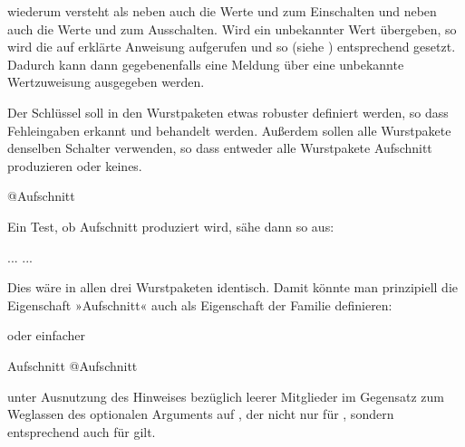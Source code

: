  wiederum versteht als  neben 
auch die Werte  und  zum Einschalten und neben
 auch die Werte  und  zum
Ausschalten. Wird ein unbekannter Wert übergeben, so wird die auf
 erklärte Anweisung
 aufgerufen und so
 (siehe
) entsprechend gesetzt. Dadurch
kann dann gegebenenfalls eine Meldung über eine unbekannte Wertzuweisung
ausgegeben werden.%
\begin{Example}
  Der Schlüssel  soll in den Wurstpaketen etwas robuster
  definiert werden, so dass Fehleingaben erkannt und behandelt
  werden. Außerdem sollen alle Wurstpakete denselben Schalter
  verwenden, so dass entweder alle Wurstpakete Aufschnitt produzieren oder
  keines.
\begin{lstcode}
                                  {@Aufschnitt}
\end{lstcode}
  Ein Test, ob Aufschnitt produziert wird, sähe dann so aus:
\begin{lstcode}
  \if@Aufschnitt
     ...
  \else
     ...
  \fi
\end{lstcode}
  Dies wäre in allen drei Wurstpaketen identisch. Damit könnte man
  prinzipiell die Eigenschaft »Aufschnitt« auch als Eigenschaft der Familie
  definieren:
  oder einfacher
\begin{lstcode}
                  {Aufschnitt}%
                  {@Aufschnitt}
\end{lstcode}
  unter Ausnutzung des Hinweises bezüglich leerer Mitglieder
  \iftrue%
  im Gegensatz zum Weglassen des optionalen Arguments
  \fi%
  auf , der nicht nur für
  , sondern entsprechend auch für
   gilt.


\end{Example}
